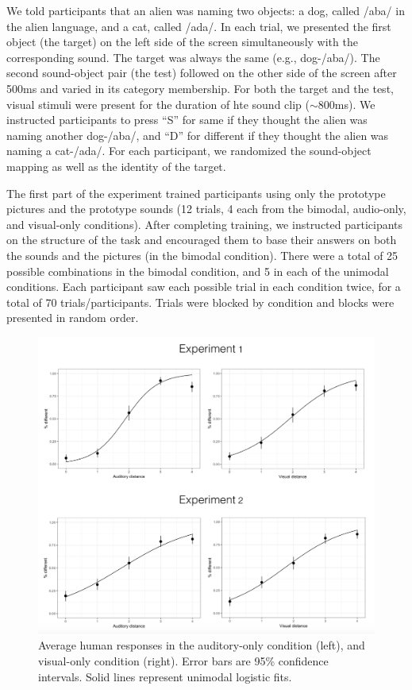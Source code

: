 \documentclass[10pt,letterpaper]{article}
\begin{document}
We told participants that an alien was naming two objects: a dog, called /aba/ in the alien language, and a cat, called /ada/. In each trial, we presented the first object (the target) on the left side of the screen simultaneously with the corresponding sound. The target was always the same (e.g., dog-/aba/). The second sound-object pair (the test) followed on the other side of the screen after 500ms and varied in its category membership. For both the target and the test, visual stimuli were present for the duration of hte sound clip ($\sim$800ms). We instructed participants to press ``S'' for same if they thought the alien was naming another dog-/aba/, and ``D'' for different if they thought the alien was naming a cat-/ada/. For each participant, we randomized the sound-object mapping as well as the identity of the target.

The first part of the experiment trained participants using only the prototype pictures and the prototype sounds (12 trials, 4 each from the bimodal, audio-only, and visual-only conditions). After completing training, we instructed participants on the structure of the task and encouraged them to base their answers on both the sounds and the pictures (in the bimodal condition). There were a total of 25 possible combinations in the bimodal condition, and 5 in each of the unimodal conditions. Each participant saw each possible trial in each condition twice, for a total of 70 trials/participants. Trials were blocked by condition and blocks were presented in random order.

\begin{figure}
\centering
\includegraphics[width=3.25in\textwidth]{unimodal.png}
\caption{Average human responses in the auditory-only condition (left), and visual-only condition (right). Error bars are 95\% confidence intervals. Solid lines represent unimodal logistic fits.}
\label{fig:unimodal}
\end{figure}
\end{document}
